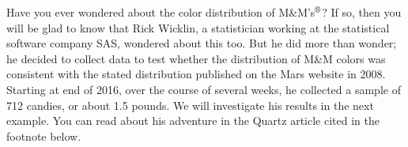Have you ever wondered about the color distribution of M\&M's$^{\text{\textregistered}}$?  If so, then you will be glad to know that Rick Wicklin, a statistician working at the statistical software company SAS, wondered about this too.  But he did more than wonder; he decided to collect data to test whether the distribution of M\&M colors was consistent with the stated distribution published on the Mars website in 2008.  Starting at end of 2016, over the course of several weeks, he collected a sample of 712 candies, or about 1.5 pounds.  We will investigate his results in the next example.  You can read about his adventure in the Quartz article cited in the footnote below.\footnotemark 
{}

\D{\newpage}

